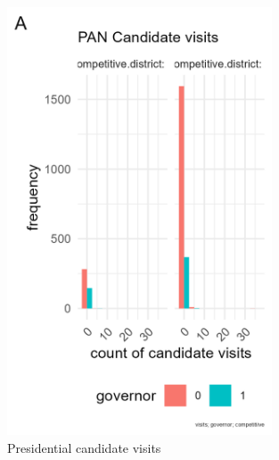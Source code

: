 \documentclass[12pt,letterpaper]{article}
\begin{document}
  \begin{figure}[!htbp]
	  \includegraphics[width=0.7\textwidth,height=0.5\textheight]{graphics/mex_hist.png}

	  \caption{Presidential candidate visits}
	  \label{fig:mex}
	\end{figure}
    
\end{document}
